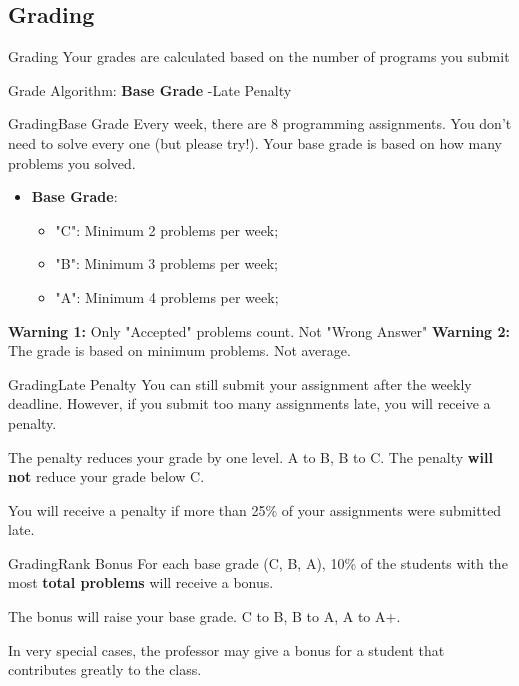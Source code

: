 \subsection{Grading}
\begin{frame}{Grading}
  Your grades are calculated based on the number of programs you submit
  \bigskip

  Grade Algorithm: {\bf Base Grade} \alert{-Late Penalty} 

\end{frame}

\begin{frame}{Grading}{Base Grade}
  Every week, there are 8 programming assignments. You don't need to solve
  every one (but please try!). Your base grade is based on how many problems
  you solved.

  \begin{itemize}
    \item {\bf Base Grade}:
    \begin{itemize}
      \item "C": Minimum 2 problems per week;
      \item "B": Minimum 3 problems per week;
      \item "A": Minimum 4 problems per week;
    \end{itemize}
  \end{itemize}

  {\bf Warning 1:} Only "Accepted" problems count. Not "Wrong Answer"
  {\bf Warning 2:} The grade is based on minimum problems. Not average.
\end{frame}

\begin{frame}{Grading}{Late Penalty}
  You can still submit your assignment after the weekly deadline.
  However, if you submit too many assignments late, you will receive a penalty.
  \bigskip

  The penalty reduces your grade by one level. A to B, B to C. The penalty
  {\bf will not} reduce your grade below C.
  \bf

  You will receive a penalty if more than 25\% of your assignments were
  submitted late.
\end{frame}

\begin{frame}{Grading}{Rank Bonus}
  For each base grade (C, B, A), 10\% of the students with the most
  {\bf total problems} will receive a bonus.
  \bigskip

  The bonus will raise your base grade. C to B, B to A, A to A+.
  \bigskip

  In very special cases, the professor may give a bonus for a student
  that contributes greatly to the class.
\end{frame}

